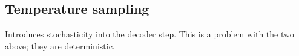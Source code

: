 \documentclass[11pt]{article}
\begin{document}
\begin{figure}[H]
    \centering
\end{figure}

\subsection{Temperature sampling}

Introduces stochasticity into the decoder step. This is a problem with the two above; they are deterministic. 
\end{document}
